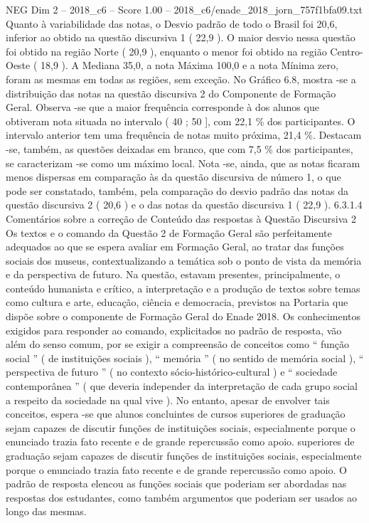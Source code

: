 \begin{textsample}{NEG Dim 2 – 2018\_c6 – Score 1.00 – 2018\_c6/enade\_2018\_jorn\_757f1bfa09.txt}
Quanto à variabilidade das notas, o Desvio padrão de todo o Brasil foi 20,6, inferior ao obtido na questão discursiva 1 ( 22,9 ).
O maior desvio nessa questão foi obtido na região Norte ( 20,9 ), enquanto o menor foi obtido na região Centro-Oeste ( 18,9 ).
A Mediana 35,0, a nota Máxima 100,0 e a nota Mínima zero, foram as mesmas em todas as regiões, sem exceção.
No Gráfico 6.8, mostra -se a distribuição das notas na questão discursiva 2 do Componente de Formação Geral.
Observa -se que a maior frequência corresponde à dos alunos que obtiveram nota situada no intervalo ( 40 ; 50 ], com 22,1 \% dos participantes.
O intervalo anterior tem uma frequência de notas muito próxima, 21,4 \%.
Destacam -se, também, as questões deixadas em branco, que com 7,5 \% dos participantes, se caracterizam -se como um máximo local.
Nota -se, ainda, que as notas ficaram menos dispersas em comparação às da questão discursiva de número 1, o que pode ser constatado, também, pela comparação do desvio padrão das notas da questão discursiva 2 ( 20,6 ) e o das notas da questão discursiva 1 ( 22,9 ). 6.3.1.4 Comentários sobre a correção de Conteúdo das respostas à Questão Discursiva 2 Os textos e o comando da Questão 2 de Formação Geral são perfeitamente adequados ao que se espera avaliar em Formação Geral, ao tratar das funções sociais dos museus, contextualizando a temática sob o ponto de vista da memória e da perspectiva de futuro.
Na questão, estavam presentes, principalmente, o conteúdo humanista e crítico, a interpretação e a produção de textos sobre temas como cultura e arte, educação, ciência e democracia, previstos na Portaria que dispõe sobre o componente de Formação Geral do Enade 2018.
Os conhecimentos exigidos para responder ao comando, explicitados no padrão de resposta, vão além do senso comum, por se exigir a compreensão de conceitos como “ função social ” ( de instituições sociais ), “ memória ” ( no sentido de memória social ), “ perspectiva de futuro ” ( no contexto sócio-histórico-cultural ) e “ sociedade contemporânea ” ( que deveria independer da interpretação de cada grupo social a respeito da sociedade na qual vive ).
No entanto, apesar de envolver tais conceitos, espera -se que alunos concluintes de cursos superiores de graduação sejam capazes de discutir funções de instituições sociais, especialmente porque o enunciado trazia fato recente e de grande repercussão como apoio. superiores de graduação sejam capazes de discutir funções de instituições sociais, especialmente porque o enunciado trazia fato recente e de grande repercussão como apoio.
O padrão de resposta elencou as funções sociais que poderiam ser abordadas nas respostas dos estudantes, como também argumentos que poderiam ser usados ao longo das mesmas.

\end{textsample}
